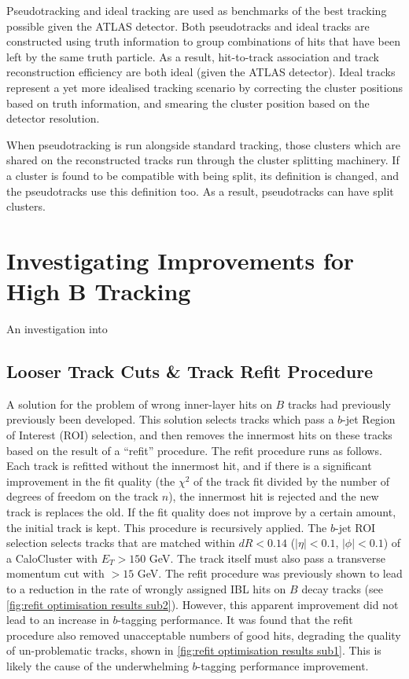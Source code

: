 Pseudotracking and ideal tracking are used as benchmarks of the best tracking possible given the ATLAS detector. Both pseudotracks and ideal tracks are constructed using truth information to group combinations of hits that have been left by the same truth particle. As a result, hit-to-track association and track reconstruction efficiency are both ideal (given the ATLAS detector). Ideal tracks represent a yet more idealised tracking scenario by correcting the cluster positions based on truth information, and smearing the cluster position based on the detector resolution.

When pseudotracking is run alongside standard tracking, those clusters which are shared on the reconstructed tracks run through the cluster splitting machinery. If a cluster is found to be compatible with being split, its definition is changed, and the pseudotracks use this definition too. As a result, pseudotracks can have split clusters.


\section{Investigating Improvements for High \texorpdfstring{\pT}{pT} B Tracking}\label{sec:investigating tracking improvements}

An investigation into


\subsection{Looser Track Cuts \& Track Refit Procedure}\label{sec:bcut and refit}

A solution for the problem of wrong inner-layer hits on $B$ tracks had previously previously been developed. This solution selects tracks which pass a $b$-jet Region of Interest (ROI) selection, and then removes the innermost hits on these tracks based on the result of a ``refit'' procedure. The refit procedure runs as follows. Each track is refitted without the innermost hit, and if there is a significant improvement in the fit quality (the $\chi^2$ of the track fit divided by the number of degrees of freedom on the track $n$), the innermost hit is rejected and the new track is replaces the old. If the fit quality does not improve by a certain amount, the initial track is kept. This procedure is recursively applied. The $b$-jet ROI selection selects tracks that are matched within $dR < 0.14$ ($|\eta| < 0.1$, $|\phi| < 0.1$) of a CaloCluster with $E_T > 150$ GeV. The track itself must also pass a transverse momentum cut with \pT$>15$ GeV. The refit procedure was previously shown to lead to a reduction in the rate of wrongly assigned IBL hits on $B$ decay tracks (see \cref{fig:refit optimisation results sub2}). However, this apparent improvement did not lead to an increase in $b$-tagging performance. It was found that the refit procedure also removed unacceptable numbers of good hits, degrading the quality of un-problematic tracks, shown in \cref{fig:refit optimisation results sub1}. This is likely the cause of the underwhelming $b$-tagging performance improvement. 


